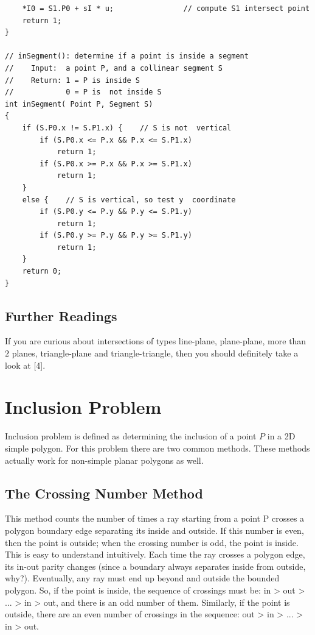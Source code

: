 \documentclass[12pt]{article}
\begin{document}
\begin{lstlisting}
    *I0 = S1.P0 + sI * u;                // compute S1 intersect point
    return 1;
}

// inSegment(): determine if a point is inside a segment
//    Input:  a point P, and a collinear segment S
//    Return: 1 = P is inside S
//            0 = P is  not inside S
int inSegment( Point P, Segment S)
{
    if (S.P0.x != S.P1.x) {    // S is not  vertical
        if (S.P0.x <= P.x && P.x <= S.P1.x)
            return 1;
        if (S.P0.x >= P.x && P.x >= S.P1.x)
            return 1;
    }
    else {    // S is vertical, so test y  coordinate
        if (S.P0.y <= P.y && P.y <= S.P1.y)
            return 1;
        if (S.P0.y >= P.y && P.y >= S.P1.y)
            return 1;
    }
    return 0;
}
\end{lstlisting}

\subsection{Further Readings}
If you are curious about intersections of types line-plane, plane-plane, 
more than $2$ planes, triangle-plane and triangle-triangle, then you should 
definitely take a look at [4]. 

\section{Inclusion Problem}
Inclusion problem is defined as determining the inclusion of a point $P$ in a 2D 
simple polygon. For this problem there are two common methods. These methods
actually work for non-simple planar polygons as well. 
\subsection{The Crossing Number Method}

This method counts the number of times a ray starting from a point P crosses a 
polygon boundary edge separating its inside and outside. If this number is even, 
then the point is outside; when the crossing number is odd, the point 
is inside. This is easy to understand intuitively. Each time the ray crosses a 
polygon edge, its in-out parity changes (since a boundary always separates inside 
from outside, why?). Eventually, any ray must end up beyond and outside the 
bounded polygon. So, if the point is inside, the sequence of crossings 
must be: in > out > ... > in > out, and there is an odd number of them. 
Similarly, if the point is outside, there are an even number of crossings in 
the sequence: out > in > ... > in > out.
\end{document}
